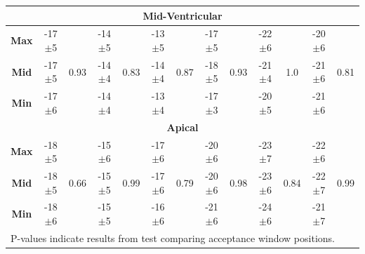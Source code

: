 \begin{appendices}
\begin{table}
\begin{tabular}{ccccccccccccc}
			\multicolumn{13}{c}{\textbf{Mid-Ventricular}} \\
			\midrule
			\textbf{Max} & -17$\pm$5 & \multirow{3}{*}{0.93} & -14$\pm$5 & \multirow{3}{*}{0.83} & -13$\pm$5 & \multirow{3}{*}{0.87}
						 & -17$\pm$5 & \multirow{3}{*}{0.93} & -22$\pm$6 & \multirow{3}{*}{1.0}  & -20$\pm$6 & \multirow{3}{*}{0.81} \\
			\textbf{Mid} & -17$\pm$5 &                       & -14$\pm$4 &                       & -14$\pm$4 & 
						 & -18$\pm$5 &                       & -21$\pm$4 &                       & -21$\pm$6 &                       \\
			\textbf{Min} & -17$\pm$6 &                       & -14$\pm$4 &                       & -13$\pm$4 & 
						 & -17$\pm$3 &                       & -20$\pm$5 &                       & -21$\pm$6 & \\ 
			\midrule
			
			\multicolumn{13}{c}{\textbf{Apical}} \\
			\midrule
			\textbf{Max} & -18$\pm$5 & \multirow{3}{*}{0.66} & -15$\pm$6 & \multirow{3}{*}{0.99} & -17$\pm$6 & \multirow{3}{*}{0.79}
						 & -20$\pm$6 & \multirow{3}{*}{0.98} & -23$\pm$7 & \multirow{3}{*}{0.84} & -22$\pm$6 & \multirow{3}{*}{0.99} \\
			\textbf{Mid} & -18$\pm$5 &                       & -15$\pm$5 &                       & -17$\pm$6 & 
						 & -20$\pm$6 &                       & -23$\pm$6 &                       & -22$\pm$7 &                       \\
			\textbf{Min} & -18$\pm$6 &                       & -15$\pm$5 &                       & -16$\pm$6 & 
						 & -21$\pm$6 &                       & -24$\pm$6 &                       & -21$\pm$7 & \\ 
			\bottomrule
			\multicolumn{13}{l}{P-values indicate results from test comparing acceptance window positions.}
		\end{tabular}
	\end{table}


\end{appendices}
